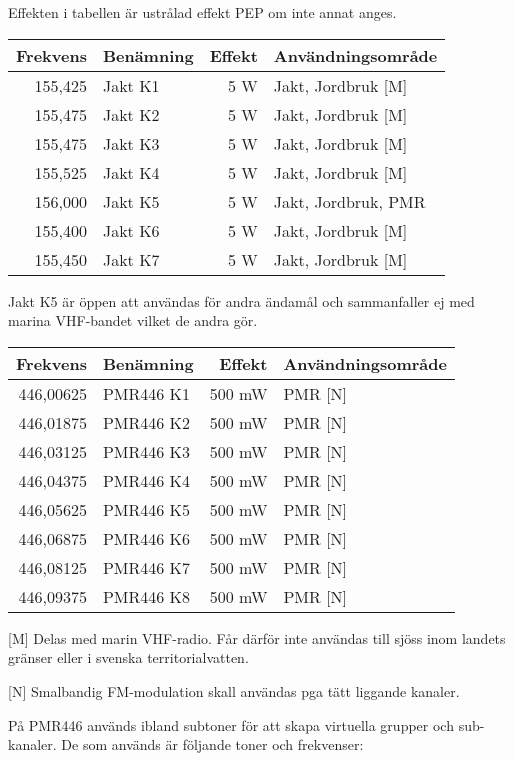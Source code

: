 \documentclass[12pt,swedish,a4paper]{article}
\begin{document}
Effekten i tabellen är ustrålad effekt PEP om inte annat anges.\\

\begin{tabular}{rlrl}
	Frekvens & Benämning & Effekt & Användningsområde   \\ \hline
	 155,425 & Jakt K1   &    5 W & Jakt, Jordbruk [M]  \\
	 155,475 & Jakt K2   &    5 W & Jakt, Jordbruk [M]  \\
	 155,475 & Jakt K3   &    5 W & Jakt, Jordbruk [M]  \\
	 155,525 & Jakt K4   &    5 W & Jakt, Jordbruk [M]  \\
	 156,000 & Jakt K5   &    5 W & Jakt, Jordbruk, PMR \\
	 155,400 & Jakt K6   &    5 W & Jakt, Jordbruk [M]  \\
	 155,450 & Jakt K7   &    5 W & Jakt, Jordbruk [M]
\end{tabular}

Jakt K5 är öppen att användas för andra ändamål och sammanfaller ej med marina VHF-bandet vilket de andra gör.

\begin{tabular}{rlrl}
	 Frekvens & Benämning & Effekt & Användningsområde \\ \hline
	446,00625 & PMR446 K1 & 500 mW & PMR [N]              \\
	446,01875 & PMR446 K2 & 500 mW & PMR [N]              \\
	446,03125 & PMR446 K3 & 500 mW & PMR [N]              \\
	446,04375 & PMR446 K4 & 500 mW & PMR [N]              \\
	446,05625 & PMR446 K5 & 500 mW & PMR [N]              \\
	446,06875 & PMR446 K6 & 500 mW & PMR [N]              \\
	446,08125 & PMR446 K7 & 500 mW & PMR [N]              \\
	446,09375 & PMR446 K8 & 500 mW & PMR [N]
\end{tabular}

[M] Delas med marin VHF-radio. Får därför inte användas till sjöss inom landets gränser eller i svenska territorialvatten.

[N] Smalbandig FM-modulation skall användas pga tätt liggande kanaler.

På PMR446 används ibland subtoner för att skapa virtuella grupper och sub-kanaler. De som används är följande toner och frekvenser:
\end{document}

